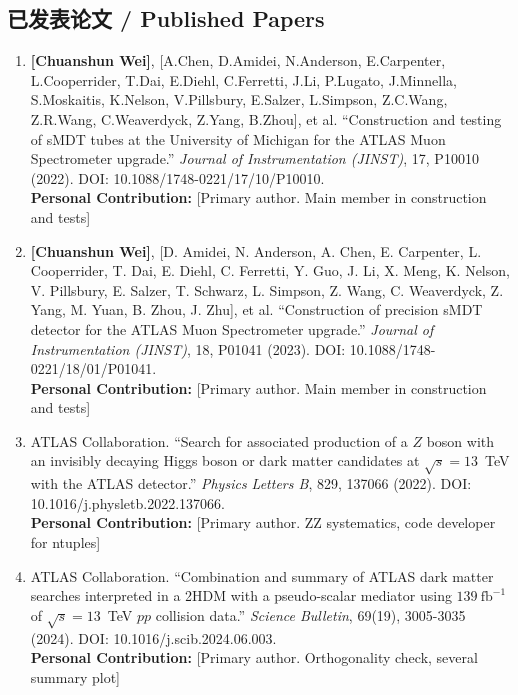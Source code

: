
\begin{publications}

\section*{已发表论文 / Published Papers}

\begin{enumerate}

\item \textbf{[Chuanshun Wei]}, [A.Chen, D.Amidei, N.Anderson, E.Carpenter, L.Cooperrider, T.Dai, E.Diehl, C.Ferretti, J.Li, P.Lugato, J.Minnella, S.Moskaitis, K.Nelson, V.Pillsbury, E.Salzer, L.Simpson, Z.C.Wang, Z.R.Wang, C.Weaverdyck, Z.Yang, B.Zhou], et al. ``Construction and testing of sMDT tubes at the University of Michigan for the ATLAS Muon Spectrometer upgrade.'' \textit{Journal of Instrumentation (JINST)}, 17, P10010 (2022). DOI: 10.1088/1748-0221/17/10/P10010.
\\ \textbf{Personal Contribution:} [Primary author. Main member in construction and tests]

\item \textbf{[Chuanshun Wei]}, [D. Amidei, N. Anderson, A. Chen, E. Carpenter, L. Cooperrider, T. Dai, E. Diehl, C. Ferretti, Y. Guo, J. Li, X. Meng, K. Nelson, V. Pillsbury, E. Salzer, T. Schwarz, L. Simpson, Z. Wang, C. Weaverdyck, Z. Yang, M. Yuan, B. Zhou, J. Zhu], et al. ``Construction of precision sMDT detector for the ATLAS Muon Spectrometer upgrade.'' \textit{Journal of Instrumentation (JINST)}, 18, P01041 (2023). DOI: 10.1088/1748-0221/18/01/P01041.
\\ \textbf{Personal Contribution:} [Primary author. Main member in construction and tests]

\item ATLAS Collaboration. ``Search for associated production of a $Z$ boson with an invisibly decaying Higgs boson or dark matter candidates at $\sqrt{s}=13$~TeV with the ATLAS detector.'' \textit{Physics Letters B}, 829, 137066 (2022). DOI: 10.1016/j.physletb.2022.137066.
\\ \textbf{Personal Contribution:} [Primary author. ZZ systematics, code developer for ntuples]

\item ATLAS Collaboration. ``Combination and summary of ATLAS dark matter searches interpreted in a 2HDM with a pseudo-scalar mediator using $139~\text{fb}^{-1}$ of $\sqrt{s}=13$~TeV $pp$ collision data.'' \textit{Science Bulletin}, 69(19), 3005-3035 (2024). DOI: 10.1016/j.scib.2024.06.003.
\\ \textbf{Personal Contribution:} [Primary author. Orthogonality check, several summary plot]


\end{enumerate}
\end{publications}
